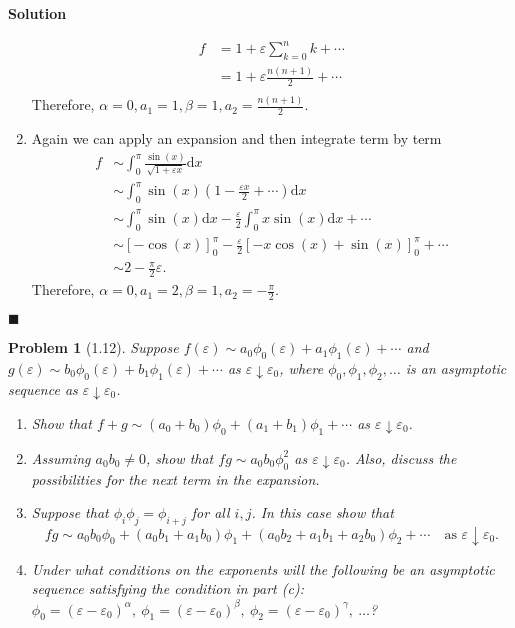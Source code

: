 \documentclass[11pt]{article}
\newcommand{\vep}{\varepsilon}
\theoremstyle{problemstyle}
\newtheorem{problem}{Problem}
\newenvironment{solution}
  {\noindent\textbf{Solution}\quad}
  {\hfill$\blacksquare$\par\vspace{1em}}
\begin{document}
\begin{solution}
\begin{enumerate}
      \begin{align*}
        f & = 1 + \vep \sum_{k=0}^n k + \cdots \\
          & = 1 + \vep \frac{n(n+1)}{2} + \cdots \\
      \end{align*}
      Therefore, $\alpha = 0, a_1 = 1, \beta = 1, a_2 = \frac{n(n+1)}{2}$.
    \item Again we can apply an expansion and then integrate term by term
      \begin{align*}
        f & \sim \int_0^\pi \frac{\sin(x)}{\sqrt{1 + \vep x}} \mathrm{d}x \\
          & \sim \int_0^\pi \sin(x) \left(1 - \frac{\vep x}{2} + \cdots \right) \mathrm{d}x \\
          & \sim \int_0^\pi \sin(x) \mathrm{d}x - \frac{\vep}{2} \int_0^\pi x \sin(x)
            \mathrm{d}x + \cdots \\
          & \sim \left[-\cos(x)\right]_0^\pi - \frac{\vep}{2} \left[ -x \cos(x) + \sin(x) \right]_0^\pi
            + \cdots \\
          & \sim 2 - \frac{\pi}{2} \vep.
      \end{align*}
      Therefore, $\alpha = 0, a_1 = 2, \beta = 1, a_2 = -\frac{\pi}{2}$.
  \end{enumerate}
\end{solution}

\newpage
\begin{problem}[1.12]
  Suppose $f(\varepsilon) \sim a_0 \phi_0(\varepsilon) + a_1 \phi_1(\varepsilon) + \cdots$ and
  $g(\varepsilon) \sim b_0 \phi_0(\varepsilon) + b_1 \phi_1(\varepsilon) + \cdots$ as $\varepsilon
  \downarrow \varepsilon_0$, where $\phi_0, \phi_1, \phi_2, \dots$ is an asymptotic sequence as
  $\varepsilon \downarrow \varepsilon_0$.
  \begin{enumerate}
    \item Show that $f + g \sim (a_0 + b_0)\phi_0 + (a_1 + b_1)\phi_1 + \cdots$ as $\varepsilon
      \downarrow \varepsilon_0$.
    \item Assuming $a_0 b_0 \neq 0$, show that $fg \sim a_0 b_0 \phi_0^2$ as $\varepsilon \downarrow
      \varepsilon_0$. Also, discuss the possibilities for the next term in the expansion.
    \item Suppose that $\phi_i \phi_j = \phi_{i+j}$ for all $i,j$. In this case show that
      \[
        fg \sim a_0 b_0 \phi_0 + (a_0 b_1 + a_1 b_0) \phi_1 + (a_0 b_2 + a_1 b_1 + a_2 b_0)\phi_2 +
        \cdots \quad \text{as } \varepsilon \downarrow \varepsilon_0.
      \]
    \item Under what conditions on the exponents will the following be an asymptotic sequence
      satisfying the condition in part (c): $\phi_0 = (\varepsilon - \varepsilon_0)^{\alpha},\
      \phi_1 = (\varepsilon - \varepsilon_0)^{\beta},\ \phi_2 = (\varepsilon -
      \varepsilon_0)^{\gamma},\ \dots$?
  \end{enumerate}
\end{problem}
\end{document}
